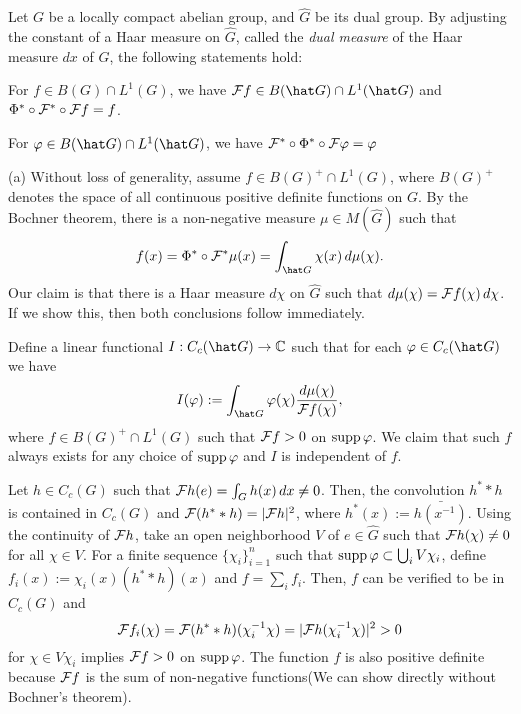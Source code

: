 \documentclass[a4paper]{article}
\begin{document}
\begin{thm}
Let $G$ be a locally compact abelian group, and $\hat G$ be its dual group.
By adjusting the constant of a Haar measure on $\hat G$, called the \emph{dual measure} of the Haar measure $dx$ of $G$, the following statements hold:
\begin{parts}
\item For $f\in B(G)\cap L^1(G)$, we have $\cF f\in B(\hat G)\cap L^1(\hat G)$ and $\Phi^*\circ\mathcal{F}^*\circ\mathcal{F} f=f$.
\item For $\f\in B(\hat G)\cap L^1(\hat G)$, we have $\mathcal{F}^*\circ\Phi^*\circ\mathcal{F}\varphi=\varphi$
\end{parts}
\end{thm}
\begin{pf}
(a)
Without loss of generality, assume $f\in B(G)^+\cap L^1(G)$, where $B(G)^+$ denotes the space of all continuous positive definite functions on $G$.
By the Bochner theorem, there is a non-negative measure $\mu\in M(\hat G)$ such that
\[f(x)=\Phi^*\circ\cF^*\mu(x)=\int_{\hat G}\chi(x)\,d\mu(\chi).\]
Our claim is that there is a Haar measure $d\chi$ on $\hat G$ such that $d\mu(\chi)=\mathcal{F} f(\chi)\,d\chi$.
If we show this, then both conclusions follow immediately.

Define a linear functional $I:C_c(\hat G)\to\C$ such that for each $\f\in C_c(\hat G)$ we have
\[I(\f):=\int_{\hat G}\f(\chi)\frac{d\mu(\chi)}{\cF f(\chi)},\]
where $f\in B(G)^+\cap L^1(G)$ such that $\mathcal{F} f>0$ on $\operatorname{supp}\varphi$.
We claim that such $f$ always exists for any choice of $\operatorname{supp}\varphi$ and $I$ is independent of $f$.

Let $h\in C_c(G)$ such that $\mathcal{F} h(e)=\int_Gh(x)\,dx\ne0$.
Then, the convolution $h^**h$ is contained in $C_c(G)$ and $\mathcal{F}(h^**h)=|\mathcal{F} h|^2$, where $h^*(x):=\bar{h(x^{-1})}$.
Using the continuity of $\mathcal{F} h$, take an open neighborhood $V$ of $e\in\hat G$ such that $\mathcal{F} h(\chi)\ne0$ for all $\chi\in V$.
For a finite sequence $\{\chi_i\}_{i=1}^n$ such that $\operatorname{supp}\varphi\subset\bigcup_iV\chi_i$, define $f_i(x):=\chi_i(x)(h^**h)(x)$ and $f=\sum_if_i$.
Then, $f$ can be verified to be in $C_c(G)$ and
\[\mathcal{F} f_i(\chi)=\mathcal{F}(h^**h)(\chi_i^{-1}\chi)=|\mathcal{F} h(\chi_i^{-1}\chi)|^2>0\]
for $\chi\in V\chi_i$ implies $\mathcal{F} f>0$ on $\operatorname{supp}\varphi$.
The function $f$ is also positive definite because $\mathcal{F} f$ is the sum of non-negative functions(We can show directly without Bochner's theorem).


\end{pf}
\end{document}
